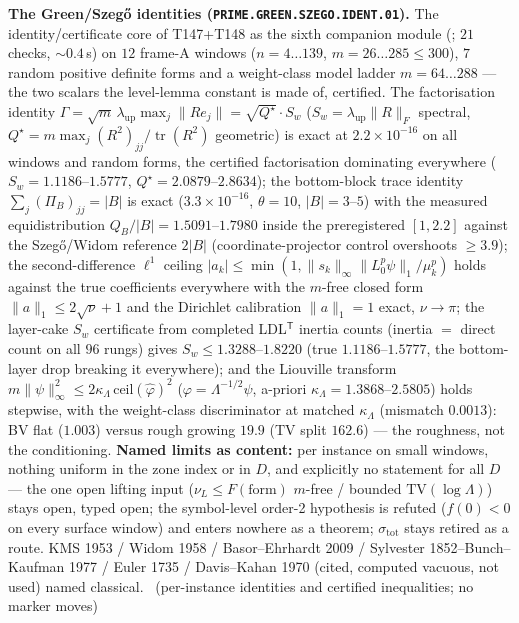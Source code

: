 \par\smallskip\noindent\textbf{The Green/Szeg\H{o} identities
(\texttt{PRIME.GREEN.SZEGO.IDENT.01}).}
The identity/certificate core of T147+T148 as the sixth companion module
(; $21$ checks, ${\sim}0.4$\,s) on
$12$ frame-A windows ($n=4\ldots139$, $m=26\ldots285\le300$), $7$ random
positive definite forms and a weight-class model ladder $m=64\ldots288$ ---
the two scalars the level-lemma constant is made of, certified. The
factorisation identity
$\Gamma=\sqrt m\,\lambda_{\mathrm{up}}\max_j\|Re_j\|=\sqrt{Q^\star}\cdot S_w$
($S_w=\lambda_{\mathrm{up}}\|R\|_F$ spectral,
$Q^\star=m\max_j(R^2)_{jj}/\operatorname{tr}(R^2)$ geometric) is exact at
$2.2\times10^{-16}$ on all windows and random forms, the certified
factorisation dominating everywhere ($S_w=1.1186$--$1.5777$,
$Q^\star=2.0879$--$2.8634$); the bottom-block trace identity
$\sum_j(\Pi_B)_{jj}=|B|$ is exact ($3.3\times10^{-16}$, $\theta=10$,
$|B|=3$--$5$) with the measured equidistribution $Q_B/|B|=1.5091$--$1.7980$
inside the preregistered $[1,2.2]$ against the Szeg\H{o}/Widom reference
$2|B|$ (coordinate-projector control overshoots $\ge3.9$); the
second-difference $\ell^1$ ceiling
$|a_k|\le\min(1,\|s_k\|_\infty\|L_0^p\psi\|_1/\mu_k^p)$ holds against the
true coefficients everywhere with the $m$-free closed form
$\|a\|_1\le2\sqrt\nu+1$ and the Dirichlet calibration $\|a\|_1=1$ exact,
$\nu\to\pi$; the layer-cake $S_w$ certificate from completed
LDL$^{\mathsf T}$ inertia counts (inertia $=$ direct count on all $96$
rungs) gives $S_w\le1.3288$--$1.8220$ (true $1.1186$--$1.5777$, the
bottom-layer drop breaking it everywhere); and the Liouville transform
$m\|\psi\|_\infty^2\le2\kappa_\Lambda\,\mathrm{ceil}(\hat\varphi)^2$
($\varphi=\Lambda^{-1/2}\psi$, a-priori
$\kappa_\Lambda=1.3868$--$2.5805$) holds stepwise, with the weight-class
discriminator at matched $\kappa_\Lambda$ (mismatch $0.0013$): BV flat
($1.003$) versus rough growing $19.9$ ($\mathrm{TV}$ split $162.6$) --- the
roughness, not the conditioning.
\textbf{Named limits as content:} per instance on small windows, nothing
uniform in the zone index or in $D$, and explicitly no statement for all $D$
--- the one open lifting input ($\nu_L\le F(\text{form})$ $m$-free /
bounded $\mathrm{TV}(\log\Lambda)$) stays open, typed open; the
symbol-level order-2 hypothesis is refuted ($f(0)<0$ on every surface
window) and enters nowhere as a theorem; $\sigma_{\mathrm{tot}}$ stays
retired as a route. KMS 1953 / Widom 1958 / Basor--Ehrhardt 2009 /
Sylvester 1852--Bunch--Kaufman 1977 / Euler 1735 / Davis--Kahan 1970
(cited, computed vacuous, not used) named classical.
\mE\ (per-instance identities and certified inequalities; no marker moves)
\par\smallskip


